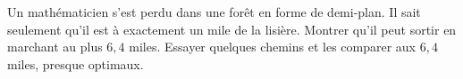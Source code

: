 Un mathématicien s'est perdu dans une forêt en forme de demi-plan. Il sait seulement qu'il est à exactement un mile de la lisière. Montrer qu'il peut sortir en marchant au plus $6{,}4$ miles. Essayer quelques chemins et les comparer aux $6{,}4$ miles, presque optimaux.
